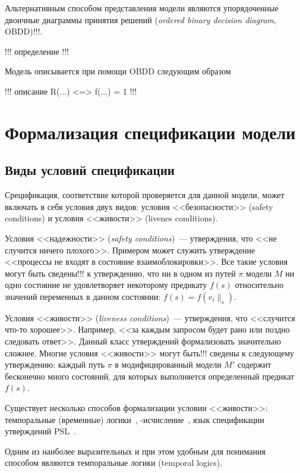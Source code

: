 \documentclass[a4paper,notitlepage,14pt]{article}
\begin{document}
Альтернативным способом представления модели являются упорядоченные двоичные диаграммы
принятия решений (\emph{ordered binary decision diagram}, OBDD)!!!. 

!!! определение !!!

Модель описывается при помощи OBDD следующим образом 

!!! описание R(...) <=> f(...) = 1 !!!

\section{Формализация спецификации модели}
\label{sec:specification}

\subsection{Виды условий спецификации}
\label{sec:cond-types}

Срецификация, соответствие которой проверяется для данной модели, может включать в себя
условия двух видов: условия <<безопасности>> (safety conditions) и условия <<живости>>
(livenes conditions).

Условия <<надежности>> (\emph{safety conditions})~--- утверждения, что <<не случится
ничего плохого>>. Примером может служить утверждение <<процессы не входят в состояние
взаимоблокировки>>. Все такие условия могут быть сведены!!! к утверждению, что ни в одном
из путей $\pi$ модели $M$ ни одно состояние не удовлетворяет некоторому предикату $f(s)$
относительно значений переменных в данном состоянии: $f(s) = f(v_i\|_s)$.

Условия <<живости>> (\emph{liveness conditions})~--- утверждения, что <<случится что-то
хорошее>>. Например, <<за каждым запросом будет рано или поздно следовать ответ>>. Данный
класс утверждений формализовать значительно сложнее. Многие условия <<живости>> могут
быть!!! сведены к следующему утверждению: каждый путь $\pi$ в модифицированный модели $M'$
содержит бесконечно много состояний, для которых выполняется определенный предикат $f(s)$.

Существует несколько способов формализации условии <<живости>>: темпоральные (временные)
логики~\cite{Clarke,Pandya01modelchecking},
\mu-исчисление~\cite{Leucker_parallelmodel,Emerson97modelchecking}, язык спецификации
утверждений PSL~\cite{Glazberg_psl:beyond}.

Одним из наиболее выразительных и при этом удобным для понимания~\cite{Stirling96modaland}
способом являются темпоральные логики (temporal logics).
\end{document}

